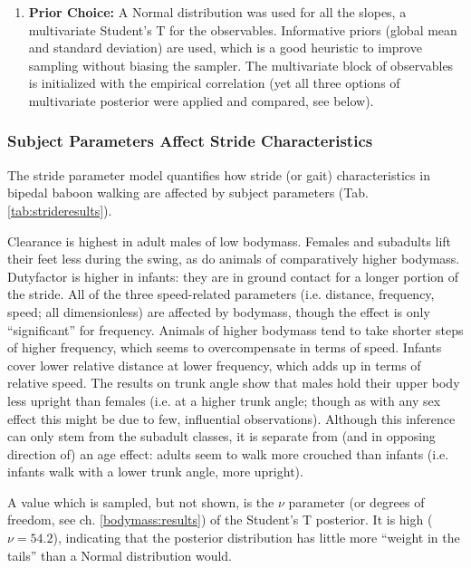 \begin{enumerate}
\item \textbf{Prior Choice:}
\label{sec:orgffbfe48}
A Normal distribution was used for all the slopes, a multivariate Student's T for the observables.
Informative priors (global mean and standard deviation) are used, which is a good heuristic to improve sampling without biasing the sampler.
The multivariate block of observables is initialized with the empirical correlation (yet all three options of multivariate posterior were applied and compared, see below).
\end{enumerate}


\subsubsection{Subject Parameters Affect Stride Characteristics}
\label{sec:orge85b957}
The stride parameter model quantifies how stride (or gait) characteristics in bipedal baboon walking are affected by subject parameters (Tab. \ref{tab:strideresults}).

Clearance is highest in adult males of low bodymass.
Females and subadults lift their feet less during the swing, as do animals of comparatively higher bodymass.
Dutyfactor is higher in infants: they are in ground contact for a longer portion of the stride.
All of the three speed-related parameters (i.e. distance, frequency, speed; all dimensionless) are affected by bodymass, though the effect is only ``significant'' for frequency.
Animals of higher bodymass tend to take shorter steps of higher frequency, which seems to overcompensate in terms of speed.
Infants cover lower relative distance at lower frequency, which adds up in terms of relative speed.
The results on trunk angle show that males hold their upper body less upright than females (i.e. at a higher trunk angle; though as with any sex effect this might be due to few, influential observations).
Although this inference can only stem from the subadult classes, it is separate from (and in opposing direction of) an age effect: adults seem to walk more crouched than infants (i.e. infants walk with a lower trunk angle, more upright).

A value which is sampled, but not shown, is the \(\nu\) parameter (or degrees of freedom, see ch. \ref{bodymass:results}) of the Student's T posterior.
It is high (\(\nu = 54.2\)), indicating that the posterior distribution has little more ``weight in the tails'' than a Normal distribution would.


